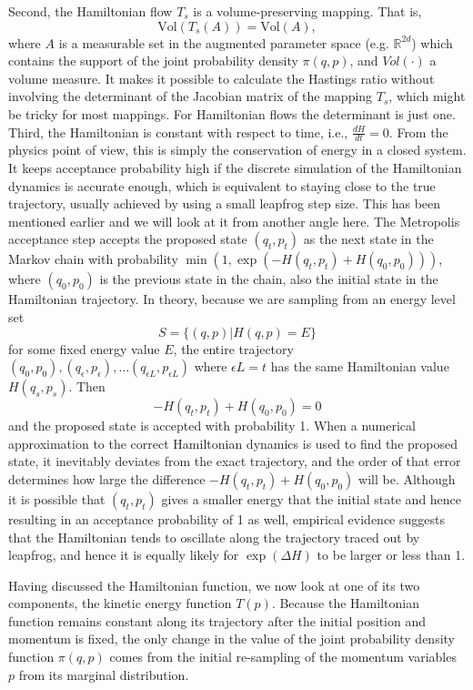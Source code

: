 \documentclass[12pt]{report}
\begin{document}
Second, the Hamiltonian flow $T_s$ is a volume-preserving mapping. That is, 
\[ \text{Vol}(T_s(A)) = \text{Vol}(A), \]
where $A$ is a measurable set in the augmented parameter space (e.g.
$\mathbb{R}^{2d}$) which contains
the support of 
the joint probability density $\pi(q,p)$, and $Vol(\cdot)$ a volume measure. 
It makes it
possible to calculate the Hastings ratio without involving the determinant of
the Jacobian matrix of the mapping $T_s$, which might be tricky for most
mappings. For Hamiltonian flows the determinant is just one.
Third, the Hamiltonian is constant with respect to time, i.e., $\frac{dH}{dt} =
0$. From the physics point of view, this is simply the conservation of energy in
a closed system. It keeps acceptance probability high if the discrete simulation
of the Hamiltonian dynamics is accurate enough, which is equivalent to staying
close to the true trajectory, usually achieved by using a small leapfrog step size. This has been mentioned earlier
and we will look at it from another angle here. The Metropolis acceptance step
accepts the proposed state $(q_t,p_t)$ as the next state in the Markov chain
with probability $\min(1, \exp(-H(q_t,p_t) + H(q_0,p_0)))$, where $(q_0,p_0)$ is
the previous state in the chain, also the initial state in the Hamiltonian
trajectory. In theory, because we are sampling from an energy level set 
\[ S=\{(q,p)|H(q,p)=E\} \]
for some fixed energy value $E$, the entire trajectory
$(q_0,p_0),(q_\epsilon,p_\epsilon),\dots (q_{\epsilon L},p_{\epsilon L})$ where
$\epsilon L = t $ has the same Hamiltonian value $H(q_s,p_s)$. Then 
\[ -H(q_t,p_t) + H(q_0,p_0) = 0 \]
and the proposed state is accepted with probability 1. When a numerical
approximation to the correct Hamiltonian dynamics is used to find the proposed
state, it inevitably deviates from the exact trajectory, and the order of that
error determines how large the difference $ -H(q_t,p_t) + H(q_0,p_0)$ will be.
Although it is possible that $(q_t,p_t)$ gives a smaller energy that the initial
state and hence resulting in an acceptance probability of 1 as well, empirical
evidence suggests that the Hamiltonian tends to oscillate along the trajectory
traced out by leapfrog, and hence it is equally likely for $\exp(\Delta H)$ to be
larger or less than 1. 

Having discussed the Hamiltonian function, we now look at one of its two
components, the kinetic energy function $T(p)$.  Because the
Hamiltonian function remains constant along its trajectory after the initial
position and momentum is fixed, the only change in the value of the joint probability
density function $\pi(q,p)$ comes from the initial re-sampling of the momentum variables $p$
from its marginal distribution.
\end{document}

